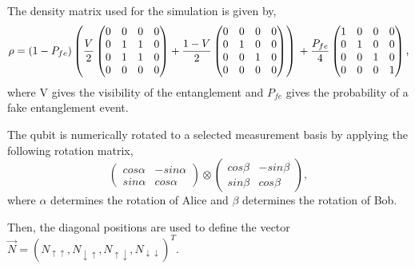 The density matrix used for the simulation is given by, 
\begin{equation}
\rho = \left(1-P_{fe}\right) \left(\frac{V}{2} \left(\begin{matrix} 
0 & 0 & 0 & 0  \\
0 & 1 & 1 & 0  \\
0 & 1 & 1 & 0  \\
0 & 0 & 0 & 0   \\
\end{matrix} \right) +  \\ \frac{1-V}{2} \left( \begin{matrix} 
0 & 0 & 0 & 0  \\
0 & 1 & 0 & 0  \\
0 & 0 & 1 & 0  \\
0 & 0 & 0 & 0   \\
\end{matrix} \right)\right) \\ + 
\frac{P_{fe}}{4} \left(\begin{matrix} 
1 & 0 & 0 & 0  \\
0 & 1 & 0 & 0  \\
0 & 0 & 1 & 0  \\
0 & 0 & 0 & 1   \\
\end{matrix} \right),
\end{equation} 
where V gives the visibility of the entanglement and $P_{fe}$ gives the probability of a fake entanglement event. 

The qubit is numerically rotated to a selected measurement basis by applying the following rotation matrix, 
\begin{equation}
\left( \begin{matrix}
cos \alpha & -sin \alpha \\
sin \alpha & cos \alpha
\end{matrix} \right) \otimes
\left( \begin{matrix}
cos \beta & -sin \beta \\
sin \beta & cos \beta
\end{matrix} \right),
\end{equation} 
where $\alpha$ determines the rotation of Alice and $\beta$ determines the rotation of Bob.  

Then, the diagonal positions are used to define the vector $\vec{N} = \left(N_{\uparrow \uparrow}, N_{\downarrow \uparrow} , N_{\uparrow \downarrow} ,N_{\downarrow \downarrow}\right)^T $. 

